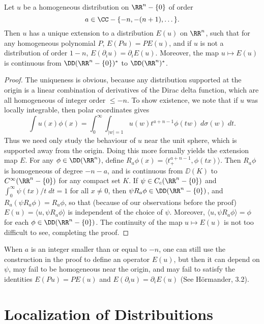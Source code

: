 \begin{theorem}
    Let $u$ be a homogeneous distribution on $\RR^n - \{ 0 \}$ of order
    \[ a \in \CC - \{ -n, -(n+1), \dots \}. \]
    Then $u$ has a unique extension to a distribution $E(u)$ on $\RR^n$, such that for any homogeneous polynomial $P$, $E(Pu) = P E(u)$, and if $u$ is not a distribution of order $1-n$, $E(\partial_i u) = \partial_i E(u)$. Moreover, the map $u \mapsto E(u)$ is continuous from $\DD(\RR^n - \{ 0 \})^*$ to $\DD(\RR^n)^*$.
\end{theorem}
\begin{proof}
    The uniqueness is obvious, because any distribution supported at the origin is a linear combination of derivatives of the Dirac delta function, which are all homogeneous of integer order $\leq -n$. To show existence, we note that if $u$ was locally integrable, then polar coordinates gives
    \[ \int u(x) \phi(x) = \int_0^\infty \int_{|w| = 1} u(w) t^{a + n-1} \phi(t w)\; d\sigma(w)\; dt. \]
    Thus we need only study the behaviour of $u$ near the unit sphere, which is supported away from the origin. Doing this more formally yields the extension map $E$. For any $\phi \in \DD(\RR^n)$, define $R_a \phi(x) = \langle t^{a + n-1}_+, \phi(tx) \rangle$. Then $R_a \phi$ is homogeneous of degree $-n-a$, and is continuous from $\DD(K)$ to $C^\infty(\RR^n - \{ 0 \})$ for any compact set $K$. If $\psi \in C_c(\RR^n - \{ 0 \})$ and $\int_0^\infty \psi(tx)/t\; dt = 1$ for all $x \neq 0$, then $\psi R_a \phi \in \DD(\RR^n - \{ 0 \})$, and $R_a(\psi R_a \phi) = R_a \phi$, so that (because of our observations before the proof) $E(u) = \langle u, \psi R_a \phi \rangle$ is independent of the choice of $\psi$. Moreover, $\langle u, \psi R_a \phi \rangle = \phi$ for each $\phi \in \DD(\RR^n - \{ 0 \})$. The continuity of the map $u \mapsto E(u)$ is not too difficult to see, completing the proof.
\end{proof}

When $a$ is an integer smaller than or equal to $-n$, one can still use the construction in the proof to define an operator $E(u)$, but then it can depend on $\psi$, may fail to be homogeneous near the origin, and may fail to satisfy the identities $E(Pu) = PE(u)$ and $E(\partial_i u) = \partial_i E(u)$ (See H\"{o}rmander, 3.2).

\section{Localization of Distribuitions}

